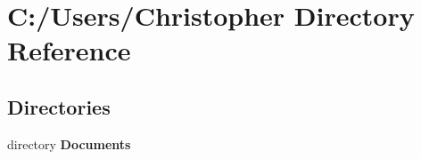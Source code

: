 \section{C\+:/\+Users/\+Christopher Directory Reference}
\label{dir_bd82762b243b438c04bab6dfda7688a5}
\subsection*{Directories}
\begin{DoxyCompactItemize}
\item 
directory {\bf Documents}
\end{DoxyCompactItemize}

